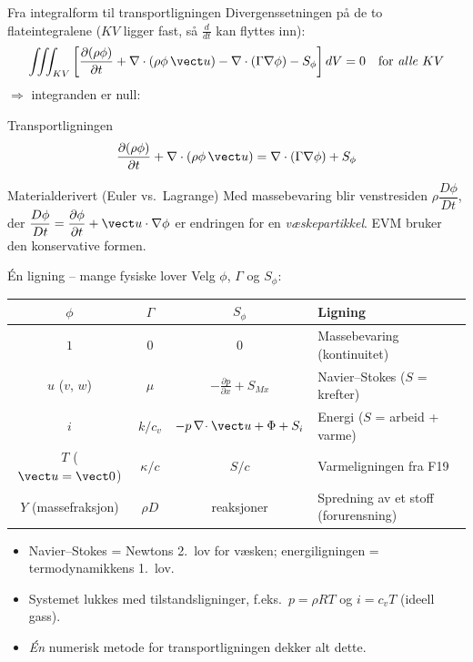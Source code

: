 \documentclass[11pt,aspectratio=169]{beamer}
\begin{document}
\begin{frame}{Fra integralform til transportligningen}
Divergenssetningen på de to flateintegralene ($KV$ ligger fast, så $\frac{d}{dt}$ kan flyttes inn):
\[
\iiint_{KV}\left[\frac{\partial(\rho\phi)}{\partial t} + \nabla\cdot(\rho\phi\,\vect u) - \nabla\cdot(\Gamma\nabla\phi) - S_\phi\right]dV = 0
\quad\text{for \emph{alle} } KV
\]
$\Rightarrow$ integranden er null:
\begin{oppsumb}{Transportligningen}
\[
\frac{\partial(\rho\phi)}{\partial t} + \nabla\cdot(\rho\phi\,\vect u) = \nabla\cdot(\Gamma\nabla\phi) + S_\phi
\]
\end{oppsumb}
\begin{remb}{Materialderivert (Euler vs.\ Lagrange)}
Med massebevaring blir venstresiden $\rho\dfrac{D\phi}{Dt}$, der $\dfrac{D\phi}{Dt}=\dfrac{\partial\phi}{\partial t}+\vect u\cdot\nabla\phi$ er endringen for en \emph{væskepartikkel}. EVM bruker den konservative formen.
\end{remb}
\end{frame}

\begin{frame}{Én ligning -- mange fysiske lover}
Velg $\phi$, $\Gamma$ og $S_\phi$:
\begin{center}
\small
\renewcommand{\arraystretch}{1.35}
\begin{tabular}{cccl}
\toprule
$\phi$ & $\Gamma$ & $S_\phi$ & Ligning \\
\midrule
$1$ & $0$ & $0$ & Massebevaring (kontinuitet) \\
$u$ ($v$, $w$) & $\mu$ & $-\frac{\partial p}{\partial x} + S_{Mx}$ & Navier--Stokes ($S$ = krefter) \\
$i$ & $k/c_v$ & $-p\,\nabla\!\cdot\vect u + \Phi + S_i$ & Energi ($S$ = arbeid + varme) \\
$T$ ($\vect u=\vect 0$) & $\kappa/c$ & $S/c$ & Varmeligningen fra F19 \\
$Y$ (massefraksjon) & $\rho D$ & reaksjoner & Spredning av et stoff (forurensning) \\
\bottomrule
\end{tabular}
\end{center}
\begin{itemize}
\item Navier--Stokes = Newtons 2.\ lov for væsken; energiligningen = termodynamikkens 1.\ lov.
\item Systemet lukkes med tilstandsligninger, f.eks.\ $p=\rho RT$ og $i=c_vT$ (ideell gass).
\item \emph{Én} numerisk metode for transportligningen dekker alt dette.
\end{itemize}
\end{frame}
\end{document}
